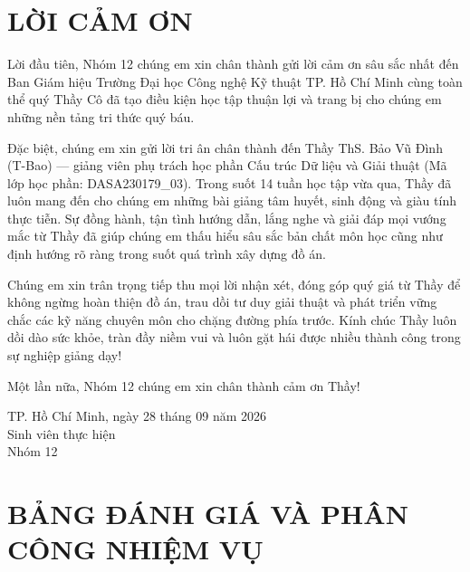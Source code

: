 \documentclass[14pt,a4paper]{extarticle}
\begin{document}
\newpage
\thispagestyle{empty}
\section*{LỜI CẢM ƠN}

Lời đầu tiên, Nhóm 12 chúng em xin chân thành gửi lời cảm ơn sâu sắc nhất đến Ban Giám hiệu Trường Đại học Công nghệ Kỹ thuật TP. Hồ Chí Minh cùng toàn thể quý Thầy Cô đã tạo điều kiện học tập thuận lợi và trang bị cho chúng em những nền tảng tri thức quý báu.

Đặc biệt, chúng em xin gửi lời tri ân chân thành đến Thầy ThS. Bảo Vũ Đình (T-Bao) --- giảng viên phụ trách học phần Cấu trúc Dữ liệu và Giải thuật (Mã lớp học phần: DASA230179\_03). Trong suốt 14 tuần học tập vừa qua, Thầy đã luôn mang đến cho chúng em những bài giảng tâm huyết, sinh động và giàu tính thực tiễn. Sự đồng hành, tận tình hướng dẫn, lắng nghe và giải đáp mọi vướng mắc từ Thầy đã giúp chúng em thấu hiểu sâu sắc bản chất môn học cũng như định hướng rõ ràng trong suốt quá trình xây dựng đồ án.

Chúng em xin trân trọng tiếp thu mọi lời nhận xét, đóng góp quý giá từ Thầy để không ngừng hoàn thiện đồ án, trau dồi tư duy giải thuật và phát triển vững chắc các kỹ năng chuyên môn cho chặng đường phía trước. Kính chúc Thầy luôn dồi dào sức khỏe, tràn đầy niềm vui và luôn gặt hái được nhiều thành công trong sự nghiệp giảng dạy!

Một lần nữa, Nhóm 12 chúng em xin chân thành cảm ơn Thầy!

\vspace{1.0cm}
\begin{flushright}
    TP. Hồ Chí Minh, ngày 28 tháng 09 năm 2026\\[0.2cm]
    Sinh viên thực hiện\\[0.2cm]
    Nhóm 12
\end{flushright}

\newpage
\thispagestyle{empty}

\section*{BẢNG ĐÁNH GIÁ VÀ PHÂN CÔNG NHIỆM VỤ}
\end{document}
